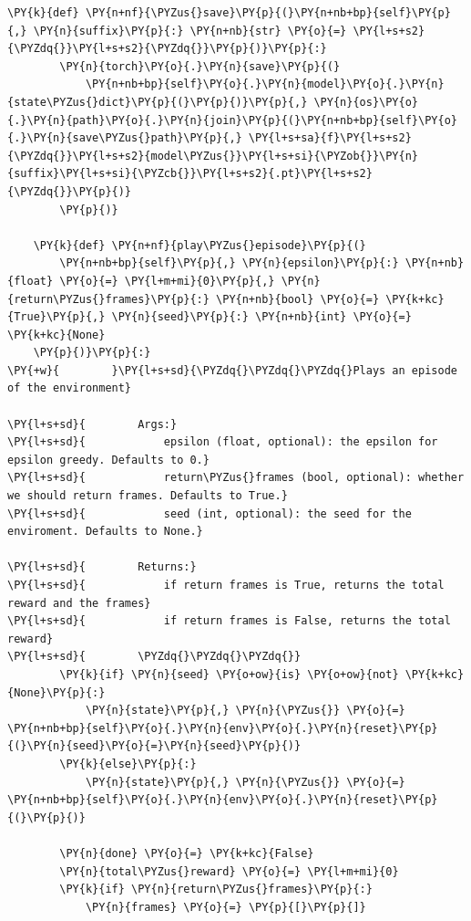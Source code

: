 \documentclass{article}
\begin{document}
\begin{Verbatim}[commandchars=\\\{\}]
    \PY{k}{def} \PY{n+nf}{\PYZus{}save}\PY{p}{(}\PY{n+nb+bp}{self}\PY{p}{,} \PY{n}{suffix}\PY{p}{:} \PY{n+nb}{str} \PY{o}{=} \PY{l+s+s2}{\PYZdq{}}\PY{l+s+s2}{\PYZdq{}}\PY{p}{)}\PY{p}{:}
        \PY{n}{torch}\PY{o}{.}\PY{n}{save}\PY{p}{(}
            \PY{n+nb+bp}{self}\PY{o}{.}\PY{n}{model}\PY{o}{.}\PY{n}{state\PYZus{}dict}\PY{p}{(}\PY{p}{)}\PY{p}{,} \PY{n}{os}\PY{o}{.}\PY{n}{path}\PY{o}{.}\PY{n}{join}\PY{p}{(}\PY{n+nb+bp}{self}\PY{o}{.}\PY{n}{save\PYZus{}path}\PY{p}{,} \PY{l+s+sa}{f}\PY{l+s+s2}{\PYZdq{}}\PY{l+s+s2}{model\PYZus{}}\PY{l+s+si}{\PYZob{}}\PY{n}{suffix}\PY{l+s+si}{\PYZcb{}}\PY{l+s+s2}{.pt}\PY{l+s+s2}{\PYZdq{}}\PY{p}{)}
        \PY{p}{)}

    \PY{k}{def} \PY{n+nf}{play\PYZus{}episode}\PY{p}{(}
        \PY{n+nb+bp}{self}\PY{p}{,} \PY{n}{epsilon}\PY{p}{:} \PY{n+nb}{float} \PY{o}{=} \PY{l+m+mi}{0}\PY{p}{,} \PY{n}{return\PYZus{}frames}\PY{p}{:} \PY{n+nb}{bool} \PY{o}{=} \PY{k+kc}{True}\PY{p}{,} \PY{n}{seed}\PY{p}{:} \PY{n+nb}{int} \PY{o}{=} \PY{k+kc}{None}
    \PY{p}{)}\PY{p}{:}
\PY{+w}{        }\PY{l+s+sd}{\PYZdq{}\PYZdq{}\PYZdq{}Plays an episode of the environment}

\PY{l+s+sd}{        Args:}
\PY{l+s+sd}{            epsilon (float, optional): the epsilon for epsilon greedy. Defaults to 0.}
\PY{l+s+sd}{            return\PYZus{}frames (bool, optional): whether we should return frames. Defaults to True.}
\PY{l+s+sd}{            seed (int, optional): the seed for the enviroment. Defaults to None.}

\PY{l+s+sd}{        Returns:}
\PY{l+s+sd}{            if return frames is True, returns the total reward and the frames}
\PY{l+s+sd}{            if return frames is False, returns the total reward}
\PY{l+s+sd}{        \PYZdq{}\PYZdq{}\PYZdq{}}
        \PY{k}{if} \PY{n}{seed} \PY{o+ow}{is} \PY{o+ow}{not} \PY{k+kc}{None}\PY{p}{:}
            \PY{n}{state}\PY{p}{,} \PY{n}{\PYZus{}} \PY{o}{=} \PY{n+nb+bp}{self}\PY{o}{.}\PY{n}{env}\PY{o}{.}\PY{n}{reset}\PY{p}{(}\PY{n}{seed}\PY{o}{=}\PY{n}{seed}\PY{p}{)}
        \PY{k}{else}\PY{p}{:}
            \PY{n}{state}\PY{p}{,} \PY{n}{\PYZus{}} \PY{o}{=} \PY{n+nb+bp}{self}\PY{o}{.}\PY{n}{env}\PY{o}{.}\PY{n}{reset}\PY{p}{(}\PY{p}{)}

        \PY{n}{done} \PY{o}{=} \PY{k+kc}{False}
        \PY{n}{total\PYZus{}reward} \PY{o}{=} \PY{l+m+mi}{0}
        \PY{k}{if} \PY{n}{return\PYZus{}frames}\PY{p}{:}
            \PY{n}{frames} \PY{o}{=} \PY{p}{[}\PY{p}{]}


\end{Verbatim}
\end{document}
